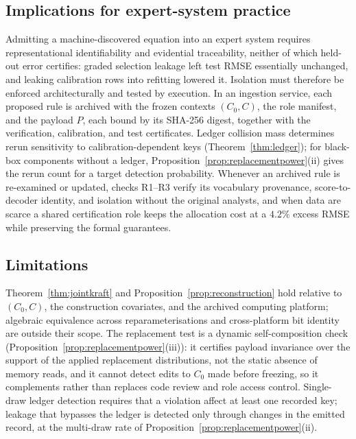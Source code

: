 \subsection{Implications for expert-system practice}

Admitting a machine-discovered equation into an expert system requires representational identifiability and evidential traceability, neither of which held-out error certifies: graded selection leakage left test RMSE essentially unchanged, and leaking calibration rows into refitting lowered it. Isolation must therefore be enforced architecturally and tested by execution. In an ingestion service, each proposed rule is archived with the frozen contexts \((C_0,C)\), the role manifest, and the payload \(P\), each bound by its SHA-256 digest, together with the verification, calibration, and test certificates. Ledger collision mass determines rerun sensitivity to calibration-dependent keys (Theorem~\ref{thm:ledger}); for black-box components without a ledger, Proposition~\ref{prop:replacementpower}(ii) gives the rerun count for a target detection probability. Whenever an archived rule is re-examined or updated, checks R1--R3 verify its vocabulary provenance, score-to-decoder identity, and isolation without the original analysts, and when data are scarce a shared certification role keeps the allocation cost at a \(4.2\%\) excess RMSE while preserving the formal guarantees.

\subsection{Limitations}\label{sec:limitations}

Theorem~\ref{thm:jointkraft} and Proposition~\ref{prop:reconstruction} hold relative to \((C_0,C)\), the construction covariates, and the archived computing platform; algebraic equivalence across reparameterisations and cross-platform bit identity are outside their scope. The replacement test is a dynamic self-composition check (Proposition~\ref{prop:replacementpower}(iii)): it certifies payload invariance over the support of the applied replacement distributions, not the static absence of memory reads, and it cannot detect edits to \(C_0\) made before freezing, so it complements rather than replaces code review and role access control. Single-draw ledger detection requires that a violation affect at least one recorded key; leakage that bypasses the ledger is detected only through changes in the emitted record, at the multi-draw rate of Proposition~\ref{prop:replacementpower}(ii).

